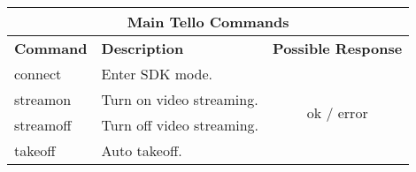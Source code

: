 \begin{table}[H]
	\begin{tabular}{@{}|llc|@{}}
		\toprule
		\multicolumn{3}{|c|}{\textbf{Main Tello Commands}}                                                                                                                                                                                                                                                                                                                      \\ \midrule
		\multicolumn{1}{|l|}{\textbf{Command}}  & \multicolumn{1}{l|}{\textbf{Description}}                                                                                                                                                                                                                                   & \multicolumn{1}{l|}{\textbf{Possible Response}} \\ \midrule
		\multicolumn{1}{|l|}{connect}           & \multicolumn{1}{l|}{Enter SDK mode.}                                                                                                                                                                                                                                        & \multirow{6}{*}{ok / error}                     \\ \cmidrule(r){1-2}
		\multicolumn{1}{|l|}{streamon}          & \multicolumn{1}{l|}{Turn on video streaming.}                                                                                                                                                                                                                               &                                                 \\ \cmidrule(r){1-2}
		\multicolumn{1}{|l|}{streamoff}         & \multicolumn{1}{l|}{Turn off video streaming.}                                                                                                                                                                                                                              &                                                 \\ \cmidrule(r){1-2}
		\multicolumn{1}{|l|}{takeoff}           & \multicolumn{1}{l|}{Auto takeoff.}                                                                                                                                                                                                                                          &                                                 \\ \cmidrule(r){1-2}

\end{tabular}
\end{table}
